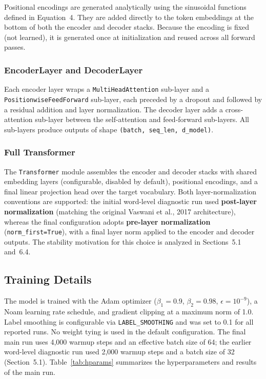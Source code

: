 Positional encodings are generated analytically using the sinusoidal functions defined in Equation~4. They are added directly to the token embeddings at the bottom of both the encoder and decoder stacks. Because the encoding is fixed (not learned), it is generated once at initialization and reused across all forward passes.

\subsubsection{EncoderLayer and DecoderLayer}

Each encoder layer wraps a \texttt{MultiHeadAttention} sub-layer and a \texttt{PositionwiseFeedForward} sub-layer, each preceded by a dropout and followed by a residual addition and layer normalization. The decoder layer adds a cross-attention sub-layer between the self-attention and feed-forward sub-layers. All sub-layers produce outputs of shape \texttt{(batch, seq\_len, d\_model)}.

\subsubsection{Full Transformer}

The \texttt{Transformer} module assembles the encoder and decoder stacks with shared embedding layers (configurable, disabled by default), positional encodings, and a final linear projection head over the target vocabulary. Both layer-normalization conventions are supported: the initial word-level diagnostic run used \textbf{post-layer normalization} (matching the original Vaswani et al., 2017 architecture), whereas the final configuration adopts \textbf{pre-layer normalization} (\texttt{norm\_first=True}), with a final layer norm applied to the encoder and decoder outputs. The stability motivation for this choice is analyzed in Sections~5.1 and~6.4.

\subsection{Training Details}

The model is trained with the Adam optimizer ($\beta_1 = 0.9$, $\beta_2 = 0.98$, $\epsilon = 10^{-9}$), a Noam learning rate schedule, and gradient clipping at a maximum norm of 1.0. Label smoothing is configurable via \texttt{LABEL\_SMOOTHING} and was set to 0.1 for all reported runs. No weight tying is used in the default configuration. The final main run uses 4{,}000 warmup steps and an effective batch size of 64; the earlier word-level diagnostic run used 2{,}000 warmup steps and a batch size of 32 (Section~5.1). Table~\ref{tab:hparams} summarizes the hyperparameters and results of the main run.

